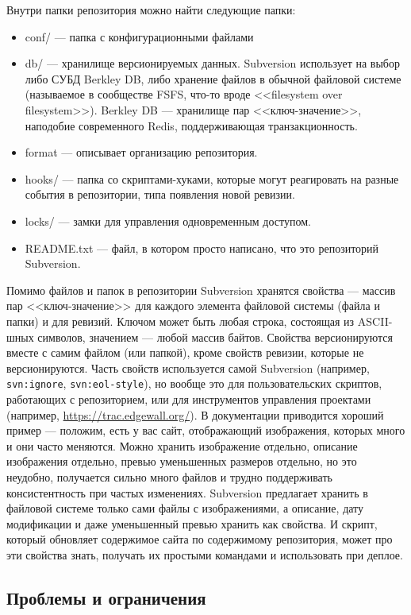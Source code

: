 \documentclass[a5paper]{article}
\begin{document}
Внутри папки репозитория можно найти следующие папки:
\begin{itemize}
    \item conf/ --- папка с конфигурационными файлами
    \item db/ --- хранилище версионируемых данных. Subversion использует на выбор либо СУБД Berkley DB, либо хранение файлов в обычной файловой системе (называемое в сообществе FSFS, что-то вроде <<filesystem over filesystem>>). Berkley DB --- хранилище пар <<ключ-значение>>, наподобие современного Redis, поддерживающая транзакционность.
    \item format --- описывает организацию репозитория.
    \item hooks/ --- папка со скриптами-хуками, которые могут реагировать на разные события в репозитории, типа появления новой ревизии.
    \item locks/ --- замки для управления одновременным доступом.
    \item README.txt --- файл, в котором просто написано, что это репозиторий Subversion.
\end{itemize}

Помимо файлов и папок в репозитории Subversion хранятся свойства --- массив пар <<ключ-значение>> для каждого элемента файловой системы (файла и папки) и для ревизий. Ключом может быть любая строка, состоящая из ASCII-шных символов, значением --- любой массив байтов. Свойства версионируются вместе с самим файлом (или папкой), кроме свойств ревизии, которые не версионируются. Часть свойств используется самой Subversion (например, \verb|svn:ignore|, \verb|svn:eol-style|), но вообще это для пользовательских скриптов, работающих с репозиторием, или для инструментов управления проектами (например, \url{https://trac.edgewall.org/}). В документации приводится хороший пример --- положим, есть у вас сайт, отображающий изображения, которых много и они часто меняются. Можно хранить изображение отдельно, описание изображения отдельно, превью уменьшенных размеров отдельно, но это неудобно, получается сильно много файлов и трудно поддерживать консистентность при частых изменениях. Subversion предлагает хранить в файловой системе только сами файлы с изображениями, а описание, дату модификации и даже уменьшенный превью хранить как свойства. И скрипт, который обновляет содержимое сайта по содержимому репозитория, может про эти свойства знать, получать их простыми командами и использовать при деплое.

\subsection{Проблемы и ограничения}
\end{document}
